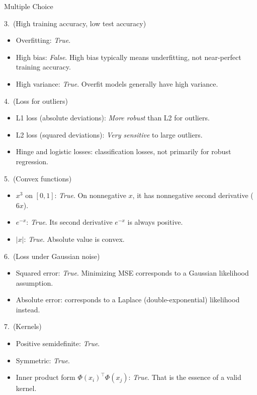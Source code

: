\documentclass{article}
\begin{document}
\begin{exercise}{Multiple Choice}
\begin{solution}
    3.\ (High training accuracy, low test accuracy)
    \begin{itemize}
      \item Overfitting: \emph{True}.
      \item High bias: \emph{False}. High bias typically means underfitting, not near-perfect training accuracy.
      \item High variance: \emph{True}. Overfit models generally have high variance.
    \end{itemize}

    4.\ (Loss for outliers)
    \begin{itemize}
      \item L1 loss (absolute deviations): \emph{More robust} than L2 for outliers.
      \item L2 loss (squared deviations): \emph{Very sensitive} to large outliers.
      \item Hinge and logistic losses: classification losses, not primarily for robust regression.
    \end{itemize}

    5.\ (Convex functions)
    \begin{itemize}
      \item $x^3$ on $[0,1]$: \emph{True}. On nonnegative $x$, it has nonnegative second derivative ($6x$).
      \item $e^{-x}$: \emph{True}. Its second derivative $e^{-x}$ is always positive.
      \item $|x|$: \emph{True}. Absolute value is convex.
    \end{itemize}

    6.\ (Loss under Gaussian noise)
    \begin{itemize}
      \item Squared error: \emph{True}. Minimizing MSE corresponds to a Gaussian likelihood assumption.
      \item Absolute error: corresponds to a Laplace (double-exponential) likelihood instead.
    \end{itemize}

    7.\ (Kernels)
    \begin{itemize}
      \item Positive semidefinite: \emph{True}.
      \item Symmetric: \emph{True}.
      \item Inner product form $\Phi(x_i)^\top \Phi(x_j)$: \emph{True}. That is the essence of a valid kernel.
    \end{itemize}
  \end{solution}
\end{exercise}
\end{document}
